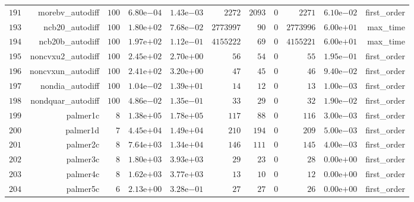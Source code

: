 \documentclass[varwidth=20cm,crop=true]{standalone}
\begin{document}
\begin{longtable}{rrrrrrrrrrr}
  \(   191\) & morebv\_autodiff & \(   100\) & \( 6.80\)e\(-04\) & \( 1.43\)e\(-03\) & \(  2272\) & \(  2093\) & \(     0\) & \(  2271\) & \( 6.10\)e\(-02\) & first\_order \\
  \(   193\) & ncb20\_autodiff & \(   100\) & \( 1.80\)e\(+02\) & \( 7.68\)e\(-02\) & \(2773997\) & \(    90\) & \(     0\) & \(2773996\) & \( 6.00\)e\(+01\) & max\_time \\
  \(   194\) & ncb20b\_autodiff & \(   100\) & \( 1.97\)e\(+02\) & \( 1.12\)e\(-01\) & \(4155222\) & \(    69\) & \(     0\) & \(4155221\) & \( 6.00\)e\(+01\) & max\_time \\
  \(   195\) & noncvxu2\_autodiff & \(   100\) & \( 2.45\)e\(+02\) & \( 2.70\)e\(+00\) & \(    56\) & \(    54\) & \(     0\) & \(    55\) & \( 1.95\)e\(-01\) & first\_order \\
  \(   196\) & noncvxun\_autodiff & \(   100\) & \( 2.41\)e\(+02\) & \( 3.20\)e\(+00\) & \(    47\) & \(    45\) & \(     0\) & \(    46\) & \( 9.40\)e\(-02\) & first\_order \\
  \(   197\) & nondia\_autodiff & \(   100\) & \( 1.04\)e\(-02\) & \( 1.39\)e\(+01\) & \(    14\) & \(    12\) & \(     0\) & \(    13\) & \( 1.00\)e\(-03\) & first\_order \\
  \(   198\) & nondquar\_autodiff & \(   100\) & \( 4.86\)e\(-02\) & \( 1.35\)e\(-01\) & \(    33\) & \(    29\) & \(     0\) & \(    32\) & \( 1.90\)e\(-02\) & first\_order \\
  \(   199\) & palmer1c & \(     8\) & \( 1.38\)e\(+05\) & \( 1.78\)e\(+05\) & \(   117\) & \(    88\) & \(     0\) & \(   116\) & \( 3.00\)e\(-03\) & first\_order \\
  \(   200\) & palmer1d & \(     7\) & \( 4.45\)e\(+04\) & \( 1.49\)e\(+04\) & \(   210\) & \(   194\) & \(     0\) & \(   209\) & \( 5.00\)e\(-03\) & first\_order \\
  \(   201\) & palmer2c & \(     8\) & \( 7.64\)e\(+03\) & \( 1.34\)e\(+04\) & \(   146\) & \(   111\) & \(     0\) & \(   145\) & \( 4.00\)e\(-03\) & first\_order \\
  \(   202\) & palmer3c & \(     8\) & \( 1.80\)e\(+03\) & \( 3.93\)e\(+03\) & \(    29\) & \(    23\) & \(     0\) & \(    28\) & \( 0.00\)e\(+00\) & first\_order \\
  \(   203\) & palmer4c & \(     8\) & \( 1.62\)e\(+03\) & \( 3.77\)e\(+03\) & \(    13\) & \(    10\) & \(     0\) & \(    12\) & \( 0.00\)e\(+00\) & first\_order \\
  \(   204\) & palmer5c & \(     6\) & \( 2.13\)e\(+00\) & \( 3.28\)e\(-01\) & \(    27\) & \(    27\) & \(     0\) & \(    26\) & \( 0.00\)e\(+00\) & first\_order \\

\end{longtable}
\end{document}
